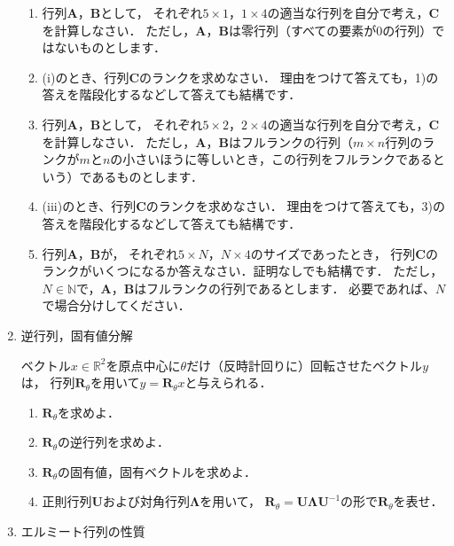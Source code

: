 \begin{enumerate}[label=問\arabic*.]
  \begin{enumerate}[label=(\roman*)]
    \item 行列$\boldsymbol{A}$，$\boldsymbol{B}$として，
      それぞれ$5\times 1$，$1\times 4$の適当な行列を自分で考え，$\boldsymbol{C}$を計算しなさい．
      ただし，$\boldsymbol{A}$，$\boldsymbol{B}$は零行列（すべての要素が0の行列）ではないものとします．
    \item (i)のとき、行列$\boldsymbol{C}$のランクを求めなさい．
      理由をつけて答えても，1)の答えを階段化するなどして答えても結構です．
    \item 行列$\boldsymbol{A}$，$\boldsymbol{B}$として，
      それぞれ$5\times 2$，$2\times 4$の適当な行列を自分で考え，$\boldsymbol{C}$を計算しなさい．
      ただし，$\boldsymbol{A}$，$\boldsymbol{B}$はフルランクの行列（$m\times n$行列のランクが$m$と$n$の小さいほうに等しいとき，この行列をフルランクであるという）であるものとします．
    \item (iii)のとき、行列$\boldsymbol{C}$のランクを求めなさい．
      理由をつけて答えても，3)の答えを階段化するなどして答えても結構です．
    \item 行列$\boldsymbol{A}$，$\boldsymbol{B}$が，
      それぞれ$5\times N$，$N\times 4$のサイズであったとき，
      行列$\boldsymbol{C}$のランクがいくつになるか答えなさい．証明なしでも結構です．
      ただし，$N\in \mathbb{N}$で，$\boldsymbol{A}$，$\boldsymbol{B}$はフルランクの行列であるとします．
      必要であれば、$N$で場合分けしてください．
  \end{enumerate}
  \item 逆行列，固有値分解

  \vspace{1mm}
  ベクトル$x \in \mathbb{R}^2$を原点中心に$\theta$だけ（反時計回りに）回転させたベクトル$y$は，
  行列$\mathbf{R}_\theta$を用いて$y = \mathbf{R}_\theta x$と与えられる．
  \begin{enumerate}[label=(\roman*)]
    \item $\mathbf{R}_\theta$を求めよ．
    \item $\mathbf{R}_\theta$の逆行列を求めよ．
    \item $\mathbf{R}_\theta$の固有値，固有ベクトルを求めよ．
    \item 正則行列$\mathbf{U}$および対角行列$\mathbf{\Lambda}$を用いて，
      $\mathbf{R}_\theta = \mathbf{U}\mathbf{\Lambda} \mathbf{U}^{-1}$の形で$\mathbf{R}_\theta$を表せ．
  \end{enumerate}

  \item エルミート行列の性質


\end{enumerate}

